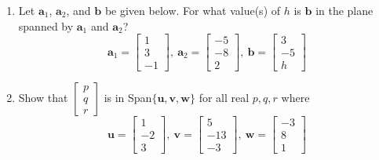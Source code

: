 \documentclass[12pt]{article}
\begin{document}
\begin{enumerate}
	\item Let $\mathbf{a}_1$, $\mathbf{a}_2$, and $\mathbf{b}$ be given below. For what value(s) of $h$ is $\mathbf{b}$ in the plane spanned by $\mathbf{a}_1$ and $\mathbf{a}_2$?
	\[
	\mathbf{a}_1 = \begin{bmatrix}
		1\\3\\-1
	\end{bmatrix},\ \mathbf{a}_2 = \begin{bmatrix}
		-5\\-8\\2
	\end{bmatrix},\ \mathbf{b} = \begin{bmatrix}
		3\\-5\\h
	\end{bmatrix}
	\] 
	\vfill

	\item Show that $\begin{bmatrix}p\\q\\r\end{bmatrix}$ is in Span$\{\mathbf{u}, \mathbf{v}, \mathbf{w}\}$ for all real $p,q,r$ where
	\[
	\mathbf{u} = \begin{bmatrix}
		1\\-2\\3
	\end{bmatrix},\ \mathbf{v} = \begin{bmatrix}
		5\\-13\\-3
	\end{bmatrix},\ \mathbf{w} = \begin{bmatrix}
		-3\\8\\1
	\end{bmatrix}
	\]
	\vfill
	\end{enumerate}
\end{document}
